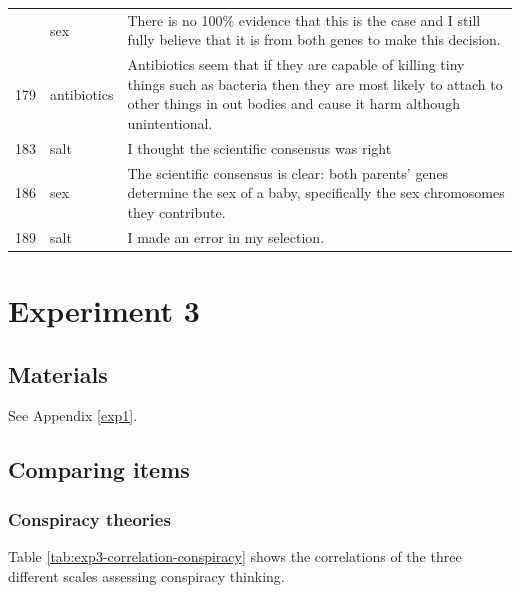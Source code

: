 \documentclass[
  doc,floatsintext]{apa6}
\begin{document}
\begin{longtable}[t]{>{}r>{}l>{\raggedright\arraybackslash}p{30em}}
\addlinespace
178 & sex & There is no 100\% evidence that this is the case and I still fully believe that it is from both genes to make this decision.\\
179 & antibiotics & Antibiotics seem that if they are capable of killing tiny things such as bacteria then they are most likely to attach to other things in out bodies and cause it harm although unintentional.\\
183 & salt & I thought the scientific consensus was right\\
186 & sex & The scientific consensus is clear: both parents' genes determine the sex of a baby, specifically the sex chromosomes they contribute.\\
189 & salt & I made an error in my selection.\\
\bottomrule
\end{longtable}

\clearpage

\section{Experiment 3}\label{exp3}

\subsection{Materials}\label{materials-5}

\FloatBarrier

See Appendix \ref{exp1}.

\subsection{Comparing items}\label{comparing-items-2}

\subsubsection{Conspiracy theories}\label{conspiracy-theories-2}

Table \ref{tab:exp3-correlation-conspiracy} shows the correlations of the three different scales assessing conspiracy thinking.
\end{document}
